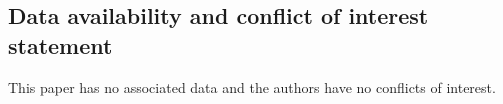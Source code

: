 \documentclass[12pt]{amsart}
\renewcommand{\1}{{\mathbf 1}}
\theoremstyle{others}
\numberwithin{equation}{section}
\begin{document}

\subsection*{Data availability and conflict of interest statement}

This paper has no associated data and the authors have no conflicts of interest.






  
\end{document}
